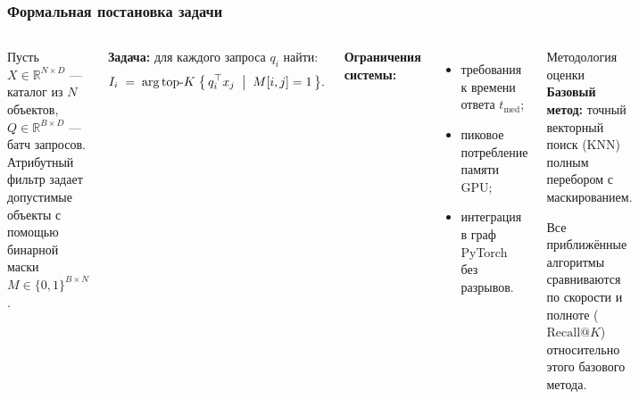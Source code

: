 \documentclass[aspectratio=169,9pt]{beamer}
\begin{document}
\begin{frame}
\frametitle{Формальная постановка задачи}

\begin{columns}[T]
  Пусть $X \in \mathbb{R}^{N \times D}$ --- каталог из $N$ объектов, $Q \in \mathbb{R}^{B \times D}$ --- батч запросов.
  Атрибутный фильтр задает допустимые объекты с помощью бинарной маски $M\in\{0,1\}^{B\times N}$.

  \vspace{0.5em}
  \textbf{Задача:} для каждого запроса $q_i$ найти:
  \[
    I_i \;=\; \arg\mathrm{top}\text{-}K \;\bigl\{\, q_i^\top x_j \;\bigm|\; M[i,j] = 1 \,\bigr\}.
  \]

  \vspace{0.5em}
  \textbf{Ограничения системы:}
  \begin{itemize}\small
    \item требования к времени ответа $t_\mathrm{med}$;
    \item пиковое потребление памяти GPU;
    \item интеграция в граф PyTorch без разрывов.
  \end{itemize}

  \begin{block}{Методология оценки}
    \textbf{Базовый метод:} точный векторный поиск (KNN) полным перебором с маскированием.

    \vspace{0.5em}
    Все приближённые алгоритмы сравниваются по скорости и полноте ($\mathrm{Recall@}K$) относительно этого базового метода.
  \end{block}
\end{columns}
\end{frame}
\end{document}
